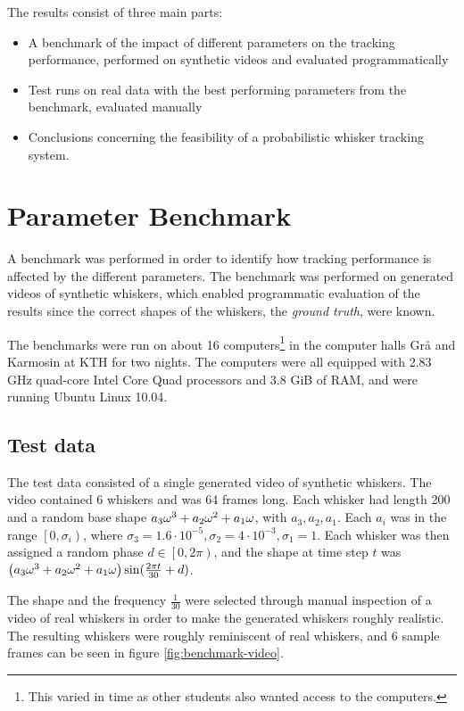 The results consist of three main parts:
\begin{itemize}
\item A benchmark of the impact of different parameters on the
  tracking performance, performed on synthetic videos and evaluated
  programmatically
\item Test runs on real data with the best performing parameters from
  the benchmark, evaluated manually
\item Conclusions concerning the feasibility of a probabilistic
  whisker tracking system.
\end{itemize}

\section{Parameter Benchmark}

A benchmark was performed in order to identify how tracking
performance is affected by the different parameters. The benchmark was
performed on generated videos of synthetic whiskers, which enabled
programmatic evaluation of the results since the correct shapes of the
whiskers, the \emph{ground truth}, were known.

The benchmarks were run on about 16 computers\footnote{This varied in
  time as other students also wanted access to the computers.} in the
computer halls Grå and Karmosin at KTH for two nights. The computers
were all equipped with 2.83 GHz quad-core Intel\textregistered \;
Core\texttrademark {} Quad processors and 3.8 GiB of RAM, and were
running Ubuntu Linux 10.04.

\subsection{Test data}
\label{sec:test-data}

The test data consisted of a single generated video of synthetic
whiskers. The video contained 6 whiskers and was 64 frames long. Each
whisker had length 200 and a random base shape $a_3\omega^3 + a_2\omega^2 + a_1\omega$, with
$a_3, a_2, a_1$. Each $a_i$ was in the range $\left[0,
  \sigma_i\right)$, where $\sigma_3 = 1.6 \cdot 10^{-5}, \sigma_2 =
4\cdot 10^{-3}, \sigma_1 = 1$. Each whisker was then assigned a random
phase $d \in \left[0, 2\pi\right)$, and the shape at time step $t$ was
$\left(a_3\omega^3 + a_2\omega^2 + a_1\omega\right) \sin(\frac{2\pi t}{30} + d)$.

The shape and the frequency $\frac{1}{30}$ were selected through
manual inspection of a video of real whiskers in order to make the
generated whiskers roughly realistic. The resulting whiskers were
roughly reminiscent of real whiskers, and 6 sample frames can be seen
in figure \ref{fig:benchmark-video}.

